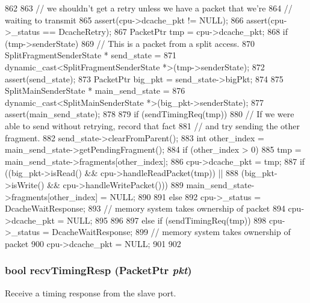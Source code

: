 \begin{DoxyCode}
862 {
863     // we shouldn't get a retry unless we have a packet that we're
864     // waiting to transmit
865     assert(cpu->dcache_pkt != NULL);
866     assert(cpu->_status == DcacheRetry);
867     PacketPtr tmp = cpu->dcache_pkt;
868     if (tmp->senderState) {
869         // This is a packet from a split access.
870         SplitFragmentSenderState * send_state =
871             dynamic_cast<SplitFragmentSenderState *>(tmp->senderState);
872         assert(send_state);
873         PacketPtr big_pkt = send_state->bigPkt;
874         
875         SplitMainSenderState * main_send_state =
876             dynamic_cast<SplitMainSenderState *>(big_pkt->senderState);
877         assert(main_send_state);
878 
879         if (sendTimingReq(tmp)) {
880             // If we were able to send without retrying, record that fact
881             // and try sending the other fragment.
882             send_state->clearFromParent();
883             int other_index = main_send_state->getPendingFragment();
884             if (other_index > 0) {
885                 tmp = main_send_state->fragments[other_index];
886                 cpu->dcache_pkt = tmp;
887                 if ((big_pkt->isRead() && cpu->handleReadPacket(tmp)) ||
888                         (big_pkt->isWrite() && cpu->handleWritePacket())) {
889                     main_send_state->fragments[other_index] = NULL;
890                 }
891             } else {
892                 cpu->_status = DcacheWaitResponse;
893                 // memory system takes ownership of packet
894                 cpu->dcache_pkt = NULL;
895             }
896         }
897     } else if (sendTimingReq(tmp)) {
898         cpu->_status = DcacheWaitResponse;
899         // memory system takes ownership of packet
900         cpu->dcache_pkt = NULL;
901     }
902 }
\end{DoxyCode}
\hypertarget{classTimingSimpleCPU_1_1DcachePort_a482dba5588f4bee43e498875a61e5e0b}{
\subsubsection[{recvTimingResp}]{\setlength{\rightskip}{0pt plus 5cm}bool recvTimingResp ({\bf PacketPtr} {\em pkt})}}
\label{classTimingSimpleCPU_1_1DcachePort_a482dba5588f4bee43e498875a61e5e0b}
Receive a timing response from the slave port. 

